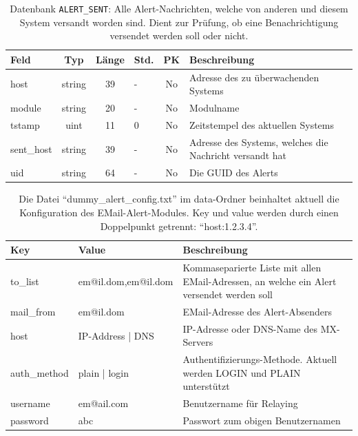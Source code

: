 \begin{table}[H]
\centering
\begin{tabular}{l|c|c|l|c|p{7.5cm}}
 \toprule
 Feld & Typ & L\"ange & Std. & PK & Beschreibung\\
 \midrule
 host & string & 39 & - & No & Adresse des zu \"uberwachenden Systems\\
 \midrule
 module & string & 20 & - & No & Modulname\\
 \midrule
 tstamp & uint & 11 & 0 & No & Zeitstempel des aktuellen Systems\\
 \midrule
 sent\_host & string & 39 & - & No & Adresse des Systems, welches die Nachricht versandt hat\\
 \midrule
 uid & string & 64 & - & No & Die GUID des Alerts\\
 \bottomrule
\end{tabular}
\caption[Datenbank-Tabelle: ALERT\_SENT]{Datenbank \texttt{ALERT\_SENT}: Alle Alert-Nachrichten, welche von anderen und diesem System versandt worden sind. Dient zur Pr\"ufung, ob eine Benachrichtigung versendet werden soll oder nicht.}
\label{tbl:praxis-basis-data-table_alertsent}
\end{table}

\begin{table}[H]
\centering
\begin{tabular}{l|l|p{8cm}}
 \toprule
 Key & Value & Beschreibung\\
 \midrule
 to\_list & em@il.dom,em@il.dom & Kommaseparierte Liste mit allen EMail-Adressen, an welche ein Alert versendet werden soll\\
 \midrule
 mail\_from & em@il.dom & EMail-Adresse des Alert-Absenders\\
 \midrule
 host & IP-Address | DNS & IP-Adresse oder DNS-Name des MX-Servers\\
 \midrule
 auth\_method & plain | login & Authentifizierungs-Methode. Aktuell werden LOGIN und PLAIN unterst\"utzt\\
 \midrule
 username & em@ail.com & Benutzername f\"ur Relaying\\
 \midrule
 password & abc & Passwort zum obigen Benutzernamen\\
 \bottomrule
\end{tabular}
\caption[Datei dummy\_alert\_config.txt]{Die Datei "`dummy\_alert\_config.txt"' im data-Ordner beinhaltet aktuell die Konfiguration des EMail-Alert-Modules. Key und value werden durch einen Doppelpunkt getrennt: "`host:1.2.3.4"'.}
\label{tbl:praxis-install-dummyalertconf}
\end{table}


